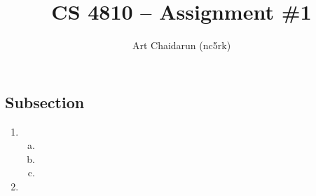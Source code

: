 \documentclass[letterpaper,12pt]{article}
\begin{document}
\title{\vspace{-0.5in}CS 4810 -- Assignment \#1}
\author{Art Chaidarun (nc5rk)}
\renewcommand{\today}{August 7, 2013}
\maketitle
\thispagestyle{empty}
\pagestyle{empty}

\subsection*{Subsection}

\begin{enumerate}
  \item
    \begin{enumerate}[a.]
      \item
      \item
      \item
    \end{enumerate}
  \item
\end{enumerate}
\end{document}
